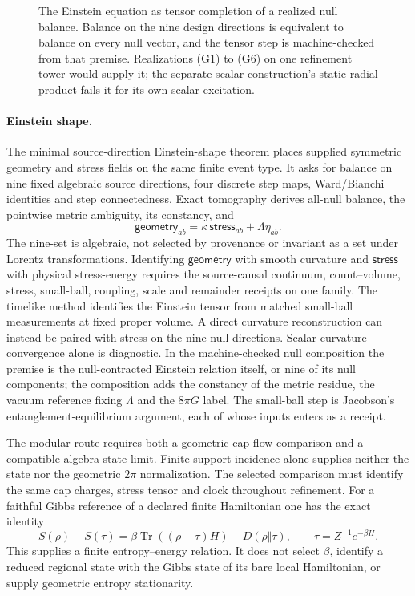 \documentclass[11pt]{article}
\begin{document}
\begin{figure}[!htb]
\centering

\caption{The Einstein equation as tensor completion of a realized null balance. Balance on the nine design directions is equivalent to balance on every null vector, and the tensor step is machine-checked from that premise. Realizations (G1) to (G6) on one refinement tower would supply it; the separate scalar construction's static radial product fails it for its own scalar excitation.}
\label{fig:einstein-chain}
\end{figure}

\paragraph{Einstein shape.}
The minimal source-direction Einstein-shape theorem places supplied symmetric
geometry and stress fields on the same finite event type. It asks for balance
on nine fixed algebraic source directions, four discrete step maps,
Ward/Bianchi identities and step connectedness. Exact tomography derives
all-null balance, the pointwise metric ambiguity, its constancy, and
\[
 \mathsf{geometry}_{ab}
   =\kappa\,\mathsf{stress}_{ab}+\Lambda\eta_{ab}.
\]
The nine-set is algebraic, not selected by provenance or invariant as a set
under Lorentz transformations. Identifying \(\mathsf{geometry}\) with smooth
curvature and \(\mathsf{stress}\) with physical stress-energy requires the
source-causal continuum, count--volume, stress, small-ball, coupling, scale
and remainder receipts on one family. The timelike method identifies the
Einstein tensor from matched small-ball measurements at fixed proper
volume. A direct curvature reconstruction can instead be paired with
stress on the nine null directions. Scalar-curvature convergence alone is
diagnostic. In the machine-checked null composition the premise is the null-contracted Einstein
relation itself, or nine of its null components; the composition adds the
constancy of the metric residue, the vacuum reference fixing $\Lambda$ and the
$8\pi G$ label. The small-ball step is Jacobson's entanglement-equilibrium
argument, each of whose inputs enters as a receipt.

The modular route requires both a geometric cap-flow comparison and a
compatible algebra-state limit. Finite support incidence alone supplies
neither the state nor the geometric $2\pi$ normalization. The selected
comparison must identify the same cap charges, stress tensor and clock
throughout refinement. For a faithful Gibbs reference of a declared finite
Hamiltonian one has the exact identity
\[
 S(\rho)-S(\tau)
 =\beta\operatorname{Tr}((\rho-\tau)H)-D(\rho\Vert\tau),
 \qquad \tau=Z^{-1}e^{-\beta H}.
\]
This supplies a finite entropy--energy relation. It does not select
$\beta$, identify a reduced regional state with the Gibbs state of its bare
local Hamiltonian, or supply geometric entropy stationarity.
\end{document}
